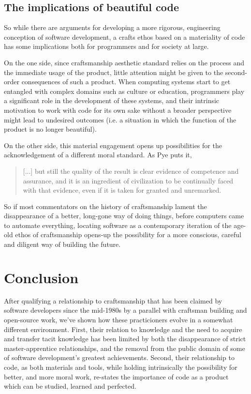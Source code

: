 \documentclass{article}
\begin{document}
\subsection{The implications of beautiful code}

So while there are arguments for developing a more rigorous, engineering conception of software development\cite{ensmenger_computer_2012}, a crafts ethos based on a materiality of code has some implications both for programmers and for society at large.

On the one side, since craftsmanship aesthetic standard relies on the process and the immediate usage of the product, little attention might be given to the second-order consequences of such a product. When computing systems start to get entangled with complex domains such as culture\cite{seaver_captivating_2019} or education\cite{perrotta_programming_2020}, programmers play a significant role in the development of these systems\cite{levy_programmation_1992}, and their intrinsic motivation to work with code for its own sake without a broader perspective might lead to undesired outcomes (i.e. a situation in which the function of the product is no longer beautiful).

On the other side, this material engagement opens up possibilities for the acknowledgement of a different moral standard. As Pye puts it,

\begin{quote}
    [...] but still the quality of the result is clear evidence of competence and assurance, and it is an ingredient of civilization to be continually faced with that evidence, even if it is taken for granted and unremarked.\cite{pye_nature_2008}
\end{quote}

So if most commentators on the history of craftsmanship lament the disappearance of a better, long-gone way of doing things, before computers came to automate everything, locating software as a contemporary iteration of the age-old ethos of craftsmanship opens-up the possibility for a more conscious, careful and diligent way of building the future.

\section{Conclusion}

After qualifying a relationship to craftsmanship that has been claimed by software developers since the mid-1980s by a parallel with craftsman building and open-source work, we've shown how these practicioners evolve in a somewhat different environment. First, their relation to knowledge and the need to acquire and transfer tacit knowledge has been limited by both the disappearance of strict master-apprentice relationships, and the removal from the public domain of some of software development's greatest achievements. Second, their relationship to code, as both materials and tools, while holding intrinsically the possibility for better, and more moral work, re-states the importance of code as a product which can be studied, learned and perfected.



\end{document}
